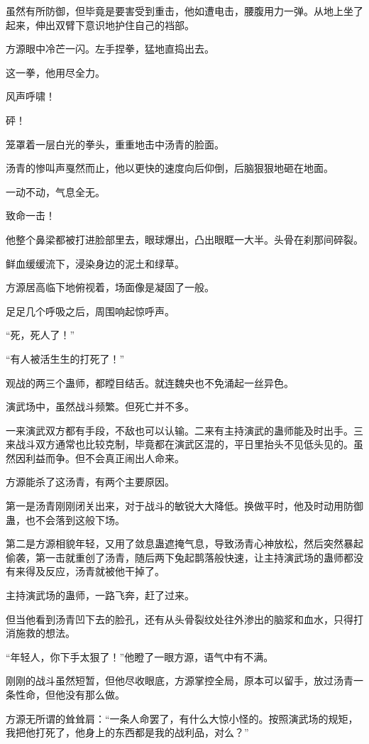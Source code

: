 \begin{this_body}
虽然有所防御，但毕竟是要害受到重击，他如遭电击，腰腹用力一弹。从地上坐了起来，伸出双臂下意识地护住自己的裆部。

方源眼中冷芒一闪。左手捏拳，猛地直捣出去。

这一拳，他用尽全力。

风声呼啸！

砰！

笼罩着一层白光的拳头，重重地击中汤青的脸面。

汤青的惨叫声戛然而止，他以更快的速度向后仰倒，后脑狠狠地砸在地面。

一动不动，气息全无。

致命一击！

他整个鼻梁都被打进脸部里去，眼球爆出，凸出眼眶一大半。头骨在刹那间碎裂。

鲜血缓缓流下，浸染身边的泥土和绿草。

方源居高临下地俯视着，场面像是凝固了一般。

足足几个呼吸之后，周围响起惊呼声。

“死，死人了！”

“有人被活生生的打死了！”

观战的两三个蛊师，都瞠目结舌。就连魏央也不免涌起一丝异色。

演武场中，虽然战斗频繁。但死亡并不多。

一来演武双方都有手段，不敌也可以认输。二来有主持演武的蛊师能及时出手。三来战斗双方通常也比较克制，毕竟都在演武区混的，平日里抬头不见低头见的。虽然因利益而争。但不会真正闹出人命来。

方源能杀了这汤青，有两个主要原因。

第一是汤青刚刚闭关出来，对于战斗的敏锐大大降低。换做平时，他及时动用防御蛊，也不会落到这般下场。

第二是方源相貌年轻，又用了敛息蛊遮掩气息，导致汤青心神放松，然后突然暴起偷袭，第一击就重创了汤青，随后两下兔起鹊落般快速，让主持演武场的蛊师都没有来得及反应，汤青就被他干掉了。

主持演武场的蛊师，一路飞奔，赶了过来。

但当他看到汤青凹下去的脸孔，还有从头骨裂纹处往外渗出的脑浆和血水，只得打消施救的想法。

“年轻人，你下手太狠了！”他瞪了一眼方源，语气中有不满。

刚刚的战斗虽然短暂，但他尽收眼底，方源掌控全局，原本可以留手，放过汤青一条性命，但他没有那么做。

方源无所谓的耸耸肩：“一条人命罢了，有什么大惊小怪的。按照演武场的规矩，我把他打死了，他身上的东西都是我的战利品，对么？”


\end{this_body}
